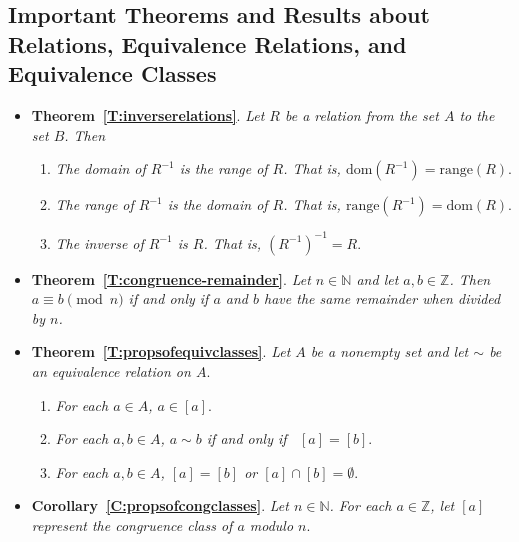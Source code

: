 \subsection*{Important Theorems and Results about Relations, Equivalence Relations, and Equivalence Classes} 
\begin{itemize}
\item \textbf{Theorem~\ref{T:inverserelations}}.
\emph{Let  $R$  be a relation from the set  $A$  to the set  $B$.  Then}

\begin{enumerate}
\item \emph{The domain of  $R^{ - 1} $ is the range of  $R$.  That is, 
$\text{dom}( {R^{ - 1} } ) = \text{range}( R )$}.  \label{T:inverserelations1}

\item \emph{The range of  $R^{ - 1} $  is the domain of  $R$.   That is, 
$\text{range}( {R^{ - 1} } ) = \text{dom}( R )$}.  \label{T:inverserelations2}

\item \emph{The inverse of  $R^{ - 1} $  is  $R$.  That is, 
$\left( {R^{ - 1} } \right)^{ - 1}  = R$}.
\end{enumerate}

\item \textbf{Theorem~\ref{T:congruence-remainder}}.
\emph{Let  $n \in \mathbb{N}$ and let  $a, b \in \mathbb{Z}$.  Then 
$a \equiv b \pmod n$  if and only if  $a$  and  $b$  have the same remainder when divided by $n$.}

\item \textbf{Theorem~\ref{T:propsofequivclasses}}.  
\emph{Let  $A$  be a nonempty set and let  $\sim$  be an equivalence relation on  $A$}.  

\begin{enumerate}
\item \emph{For each  $a \in A$,  $a \in \left[ a \right]$}.  \label{T:propsofequivclasses1}

\item \emph{For each  $a, b \in A$, $a \sim b$  if and only if \,  
$\left[ a \right] = \left[ b \right]$}.  \label{T:propsofequivclasses2}

\item \emph{For each  $a, b \in A$,   $\left[ a \right] = \left[ b \right]$  or  
$\left[ a \right] \cap \left[ b \right] = \emptyset $}.  \label{T:propsofequivclasses3}
\end{enumerate}


\item \textbf{Corollary~\ref{C:propsofcongclasses}}.
\emph{Let  $n \in \mathbb{N}$.  For each  $a \in \mathbb{Z}$, let  $\left[ a \right]$ represent the congruence class of  $a$  modulo  $n$}.


\end{itemize}
